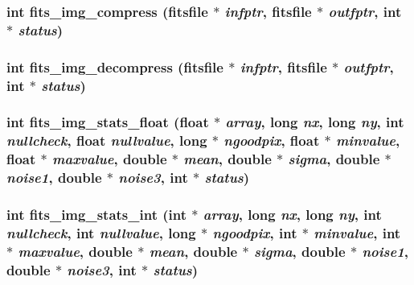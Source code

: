 \subsubsection{\setlength{\rightskip}{0pt plus 5cm}int fits\_\-img\_\-compress (\bf{fitsfile} $\ast$ {\em infptr}, \bf{fitsfile} $\ast$ {\em outfptr}, int $\ast$ {\em status})}\label{fitsio_8h_aec457fa9e69872d1b50fcf7178c5a54}


\subsubsection{\setlength{\rightskip}{0pt plus 5cm}int fits\_\-img\_\-decompress (\bf{fitsfile} $\ast$ {\em infptr}, \bf{fitsfile} $\ast$ {\em outfptr}, int $\ast$ {\em status})}\label{fitsio_8h_fe5b99742067b8d555a55b147af83cad}


\subsubsection{\setlength{\rightskip}{0pt plus 5cm}int fits\_\-img\_\-stats\_\-float (float $\ast$ {\em array}, long {\em nx}, long {\em ny}, int {\em nullcheck}, float {\em nullvalue}, long $\ast$ {\em ngoodpix}, float $\ast$ {\em minvalue}, float $\ast$ {\em maxvalue}, double $\ast$ {\em mean}, double $\ast$ {\em sigma}, double $\ast$ {\em noise1}, double $\ast$ {\em noise3}, int $\ast$ {\em status})}\label{fitsio_8h_c543649b7428ec8840c8a9c6beac2cc9}


\subsubsection{\setlength{\rightskip}{0pt plus 5cm}int fits\_\-img\_\-stats\_\-int (int $\ast$ {\em array}, long {\em nx}, long {\em ny}, int {\em nullcheck}, int {\em nullvalue}, long $\ast$ {\em ngoodpix}, int $\ast$ {\em minvalue}, int $\ast$ {\em maxvalue}, double $\ast$ {\em mean}, double $\ast$ {\em sigma}, double $\ast$ {\em noise1}, double $\ast$ {\em noise3}, int $\ast$ {\em status})}\label{fitsio_8h_75b334b5d2e8e4f22b80233208f8aaea}


